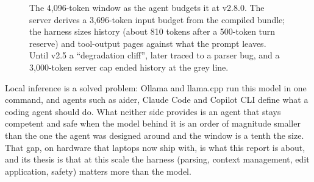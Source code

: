 \documentclass[11pt]{article}
\begin{document}
\begin{figure}[ht]
\centering
{}
\caption{The 4{,}096-token window as the agent budgets it at v2.8.0. The
server derives a 3{,}696-token input budget from the compiled bundle; the
harness sizes history (about 810 tokens after a 500-token turn reserve) and
tool-output pages against what the prompt leaves. Until v2.5 a
``degradation cliff'', later traced to a parser bug, and a 3{,}000-token
server cap ended history at the grey line.}
\label{fig:window}
\end{figure}

Local inference is a solved problem: Ollama and llama.cpp run this model in
one command, and agents such as aider, Claude Code and Copilot CLI define
what a coding agent should do. What neither side provides is an agent that
stays competent and safe when the model behind it is an order of magnitude
smaller than the one the agent was designed around and the window is a
tenth the size. That gap, on hardware that laptops now ship with, is what
this report is about, and its thesis is that at this scale the harness
(parsing, context management, edit application, safety) matters more than
the model.
\end{document}
